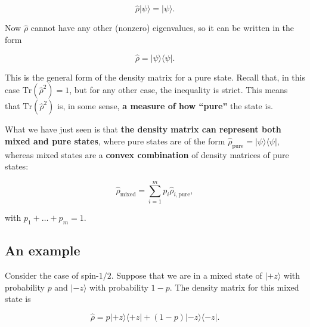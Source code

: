 \documentclass[a4]{article}
\begin{document}
\begin{equation*}\hat{\rho}|\psi\rangle = |\psi\rangle.\end{equation*}

Now $\hat{\rho}$ cannot have any other (nonzero) eigenvalues, so it
can be written in the form

\begin{equation*}\hat{\rho} = |\psi\rangle\langle\psi|.\end{equation*}

This is the general form of the density matrix for a pure state. Recall
that, in this case $\mathrm{Tr}(\hat{\rho}^2)=1$, but for any other case,
the inequality is strict. This means that $\mathrm{Tr}(\hat{\rho}^2)$ is, in
some sense, \textbf{a measure of how ``pure''} the state is.


What we have just seen is that \textbf{the density matrix can represent
both mixed and pure states}, where pure states are of the form
$\hat{\rho}_{\text{pure}}=|\psi\rangle\langle\psi|$, whereas mixed
states are a \textbf{convex combination} of density matrices of pure
states:

\begin{equation*} \hat{\rho}_{\text{mixed}} = \sum_{i=1}^m  p_i\hat{\rho}_{i,\text{pure}},\end{equation*}

with $p_1+\dots+p_m = 1$.

\subsection{An example}
\label{sec:an-example}

Consider the case of spin-$1/2$. Suppose that we are in a mixed state of $|+z\rangle$ with
probability $p$ and $|-z\rangle$ with probability $1-p$. The density matrix for this mixed state
is

\begin{equation*}
  \hat{\rho} = p|+z\rangle\langle +z | + (1-p)|-z\rangle\langle -z |.
\end{equation*}
\end{document}
